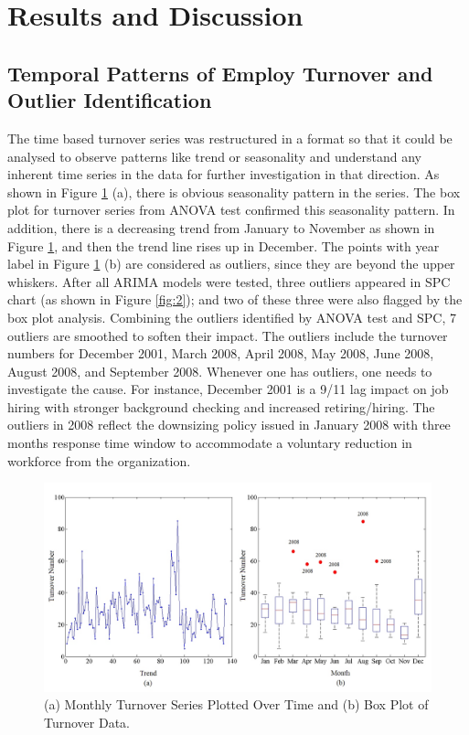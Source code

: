 \section{Results and Discussion}
\subsection{Temporal Patterns of Employ Turnover and Outlier Identification}
The time based turnover series was restructured in a format so that it could be analysed to observe patterns like trend or seasonality and understand any inherent time series in the data for further investigation in that direction. As shown in Figure \ref{fig:1} (a), there is obvious seasonality pattern in the series. The box plot for turnover series from ANOVA test confirmed this seasonality pattern. In addition, there is a decreasing trend from January to November as shown in Figure \ref{fig:1}, and then the trend line rises up in December. The points with year label in Figure \ref{fig:1} (b) are considered as outliers, since they are beyond the upper whiskers. After all ARIMA models were tested, three outliers appeared in SPC chart (as shown in Figure \ref{fig:2}); and two of these three were also flagged by the box plot analysis. Combining the outliers identified by ANOVA test and SPC, 7 outliers are smoothed to soften their impact. The outliers include the turnover numbers for December 2001, March 2008, April 2008, May 2008, June 2008, August 2008, and September 2008. Whenever one has outliers, one needs to investigate the cause. For instance, December 2001 is a 9/11 lag impact on job hiring with stronger background checking and increased retiring/hiring. The outliers in 2008 reflect the downsizing policy issued in January 2008 with three months response time window to accommodate a voluntary reduction in workforce from the organization. 
\begin{figure}
	\centering
	\includegraphics[width=5.5in]{Fig1.jpg}
	\caption{(a) Monthly Turnover Series Plotted Over Time and (b) Box Plot of Turnover Data.}
	\label{fig:1}
\end{figure}

